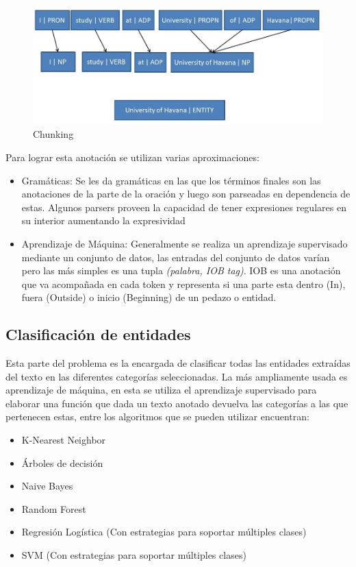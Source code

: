 \documentclass[runningheads]{llncs}
\begin{document}
\begin{figure}
\includegraphics[width=\textwidth]{namedentity.jpg}
\caption{Chunking} \label{chunkingfig}
\end{figure}

Para lograr esta anotación se utilizan varias aproximaciones:

\begin{itemize}

\item Gramáticas: Se les da gramáticas en las que los términos finales son las anotaciones de la parte de la
oración y luego son parseadas en dependencia de estas. Algunos parsers proveen la capacidad de 
tener expresiones regulares en su interior aumentando la expresividad \cite{nltkgrammar}

\item Aprendizaje de Máquina: Generalmente se realiza un aprendizaje supervisado mediante un conjunto de datos, las entradas del conjunto de datos varían pero las más simples es una tupla \emph{(palabra, IOB tag)}.  IOB es una anotación que va acompañada en cada token y representa si una parte esta dentro (In), fuera (Outside) o inicio (Beginning) de un pedazo o entidad.

\end{itemize}

\subsection{Clasificación de entidades}

Esta parte del problema es la encargada de clasificar todas las entidades extraídas del texto en las diferentes categorías seleccionadas. La más ampliamente usada es aprendizaje de máquina, en esta se utiliza el aprendizaje supervisado para elaborar una función que dada un texto anotado devuelva las categorías a las que pertenecen estas, entre los algoritmos que se pueden utilizar encuentran:

\begin{itemize}

\item K-Nearest Neighbor
\item Árboles de decisión
\item Naive Bayes
\item Random Forest
\item Regresión Logística (Con estrategias para soportar múltiples clases)
\item SVM (Con estrategias para soportar múltiples clases)

\end{itemize}
\end{document}
